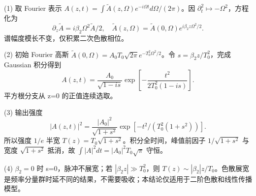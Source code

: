 (1) 取 Fourier 表示 \(A(z,t)=\int\widetilde A(z,\Omega)e^{-i\Omega t}d\Omega/(2\pi)\)。因 \(\partial_t^2\mapsto-\Omega^2\)，方程化为
\[
\partial_z\widetilde A=i\beta_2\Omega^2\widetilde A/2,\quad
\widetilde A(z,\Omega)=\widetilde A(0,\Omega)e^{i\beta_2z\Omega^2/2}.
\]
谱幅度模长不变，仅积累二次色散相位。

(2) 初始 Fourier 高斯 \(\widetilde A(0,\Omega)=A_0T_0\sqrt{2\pi}e^{-T_0^2\Omega^2/2}\)。令 \(s=\beta_2z/T_0^2\)，完成 Gaussian 积分得到
\[
A(z,t)=\frac{A_0}{\sqrt{1-is}}
\exp\left[-\frac{t^2}{2T_0^2(1-is)}\right].
\]
平方根分支从 z=0 的正值连续选取。

(3) 输出强度
\[
|A(z,t)|^2=\frac{|A_0|^2}{\sqrt{1+s^2}}
\exp[-t^2/(T_0^2(1+s^2))].
\]
所以强度 \(1/e\) 半宽 \(T(z)=T_0\sqrt{1+s^2}\)。积分全时间，峰值前因子 \(1/\sqrt{1+s^2}\) 与宽度 \(\sqrt{1+s^2}\) 抵消，故 \(\int|A|^2dt=|A_0|^2T_0\sqrt\pi\) 守恒。

(4) \(\beta_2=0\) 时 s=0，脉冲不展宽；若 \(|\beta_2z|\gg T_0^2\)，则 \(T(z)\sim|\beta_2|z/T_0\)。色散展宽是频率分量群时延不同的结果，不需要吸收；本结论仅适用于二阶色散和线性传播模型。
